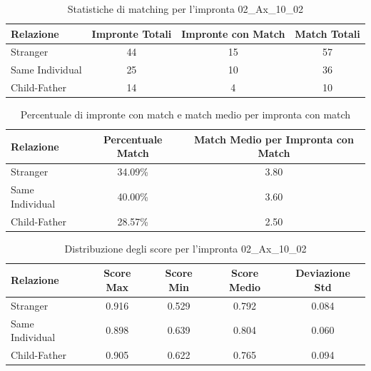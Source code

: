 \begin{table}[htbp]
\centering
\caption{Statistiche di matching per l'impronta 02\_Ax\_10\_02}
\label{tab:results_02_Ax_10_02}
\begin{tabular}{|l|c|c|c|}
\hline
\textbf{Relazione} & \textbf{Impronte Totali} & \textbf{Impronte con Match} & \textbf{Match Totali} \\
\hline
Stranger & 44 & 15 & 57 \\
\hline
Same Individual & 25 & 10 & 36 \\
\hline
Child-Father & 14 & 4 & 10 \\
\hline
\end{tabular}
\end{table}


\begin{table}[htbp]
\centering
\caption{Percentuale di impronte con match e match medio per impronta con match}
\label{tab:match_percentage_02_Ax_10_02}
\begin{tabular}{|l|c|c|}
\hline
\textbf{Relazione} & \textbf{Percentuale Match} & \textbf{Match Medio per Impronta con Match} \\
\hline
Stranger & 34.09\% & 3.80 \\
\hline
Same Individual & 40.00\% & 3.60 \\
\hline
Child-Father & 28.57\% & 2.50 \\
\hline
\end{tabular}
\end{table}


\begin{table}[htbp]
\centering
\caption{Distribuzione degli score per l'impronta 02\_Ax\_10\_02}
\label{tab:scores_02_Ax_10_02}
\begin{tabular}{|l|c|c|c|c|}
\hline
\textbf{Relazione} & \textbf{Score Max} & \textbf{Score Min} & \textbf{Score Medio} & \textbf{Deviazione Std} \\
\hline
Stranger & 0.916 & 0.529 & 0.792 & 0.084 \\
\hline
Same Individual & 0.898 & 0.639 & 0.804 & 0.060 \\
\hline
Child-Father & 0.905 & 0.622 & 0.765 & 0.094 \\
\hline
\end{tabular}
\end{table}

